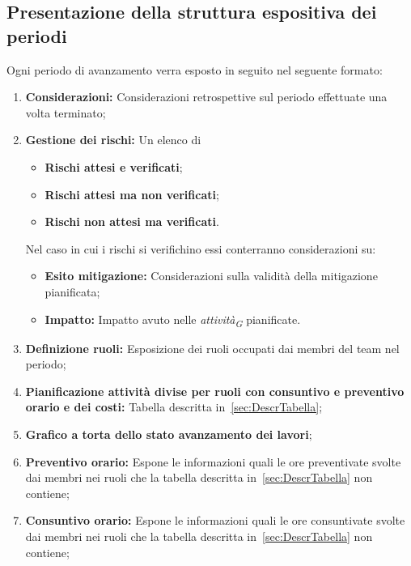 \subsection{Presentazione della struttura espositiva dei periodi}
Ogni periodo di avanzamento verra esposto in seguito nel seguente formato:
\begin{enumerate}
    \item \textbf{Considerazioni:} Considerazioni retrospettive sul periodo effettuate una volta terminato;
    \item \textbf{Gestione dei rischi:} Un elenco di 
            \begin{itemize}
                \item \textbf{Rischi attesi e verificati};
                \item \textbf{Rischi attesi ma non verificati};
                \item \textbf{Rischi non attesi ma verificati}.
            \end{itemize}
        Nel caso in cui i rischi si verifichino essi conterranno considerazioni su:
        \begin{itemize}
            \item \textbf{Esito mitigazione:} Considerazioni sulla validità della mitigazione pianificata;
            \item \textbf{Impatto:} Impatto avuto nelle \textit{attività}\textsubscript{\textit{G}} pianificate.
        \end{itemize}
    \item \textbf{Definizione ruoli:} Esposizione dei ruoli occupati dai membri del team nel periodo;
    \item \textbf{Pianificazione attività divise per ruoli con consuntivo e preventivo orario e dei costi:} Tabella descritta in~\ref{sec:DescrTabella};
    \item \textbf{Grafico a torta dello stato avanzamento dei lavori};
    \item \textbf{Preventivo orario:} Espone le informazioni quali le ore preventivate svolte dai membri nei ruoli che la tabella descritta in~\ref{sec:DescrTabella} non contiene;
    \item \textbf{Consuntivo orario:} Espone le informazioni quali le ore consuntivate svolte dai membri nei ruoli che la tabella descritta in~\ref{sec:DescrTabella} non contiene;


\end{enumerate}
